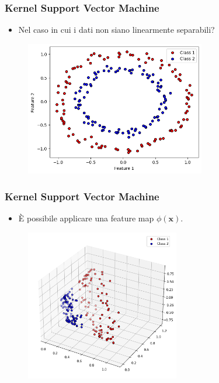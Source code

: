 \documentclass{beamer}
\begin{document}
\begin{frame}
  \frametitle{Kernel Support Vector Machine}
  
  \begin{itemize}
    \item Nel caso in cui i dati non siano linearmente separabili?
  \end{itemize}
     
        \begin{figure}
          \includegraphics[width=0.7\textwidth]{images/circles.png}
        \end{figure}
        
\end{frame}

\begin{frame}
  \frametitle{Kernel Support Vector Machine}
  
  \begin{itemize}
    \item È possibile applicare una feature map $\phi(\mathbf{x})$.
  \end{itemize}
     
        \begin{figure}
          \includegraphics[width=0.6\textwidth]{images/circles3d.png}
        \end{figure}
        
\end{frame}
\end{document}
